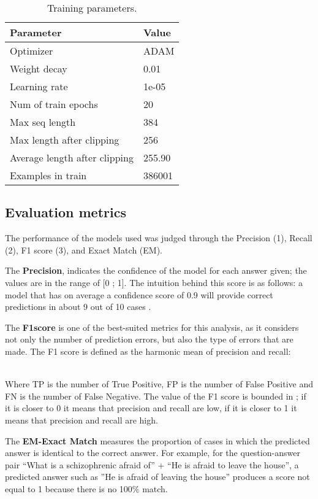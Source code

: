 \documentclass[runningheads]{llncs}
\begin{document}
\begin{table}
 \centering
\caption{Training parameters.}\label{tab1}
\begin{tabular}{|l|l|}
\hline
Parameter &  Value \\
\hline
        Optimizer   &  ADAM\\
        Weight decay    &  0.01  \\
        Learning rate   &  1e-05     \\
        Num of train epochs & 20 \\
        Max seq length  & 384 \\
        Max length  after clipping  & 256 \\
        Average length after clipping   &   255.90 \\
        Examples in train & 386001  \\ 
\hline
\end{tabular}
\end{table}

\subsection{Evaluation metrics}
The performance of the models used was judged through the Precision (1), Recall (2), F1 score (3), and Exact Match (EM).

The \textbf{Precision}, indicates the confidence of the model for each answer given; the values are in the range of [0 ; 1]. The intuition behind this score is as follows: a model that has on average a confidence score of 0.9 will provide correct predictions in about 9 out of 10 cases \cite{c7}.

The \textbf{F1score} is one of the best-suited metrics for this analysis, as it considers not only the number of prediction errors, but also the type of errors that are made. 
The F1 score is defined as the harmonic mean of precision and recall:



\\
Where TP is the number of True Positive, FP is the number of False Positive and FN is the number of False Negative.
The value of the F1 score is bounded in  ; if it is closer to 0 it means that precision and recall are low, if it is closer to 1 it means that precision and recall are high. 

The \textbf{EM-Exact Match} measures the proportion of cases in which the predicted answer is identical to the correct answer. For example, for the question-answer pair  “What is a schizophrenic afraid of” +  “He is afraid to leave the house”, a predicted answer such as ”He is afraid of leaving the house” produces a score not equal to 1 because there is no 100\% match.
\end{document}
